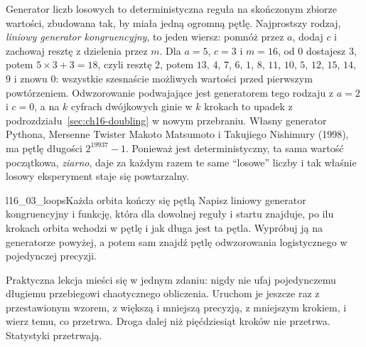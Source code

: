 \noindent
Generator liczb losowych to deterministyczna reguła na skończonym zbiorze
wartości, zbudowana tak, by miała jedną ogromną pętlę. Najprostszy rodzaj,
\emph{liniowy generator kongruencyjny}, to jeden wiersz: pomnóż przez $a$,
dodaj $c$ i zachowaj resztę z dzielenia przez $m$. Dla $a = 5$, $c = 3$ i
$m = 16$, od $0$ dostajesz $3$, potem $5 \times 3 + 3 = 18$, czyli resztę
$2$, potem $13$, $4$, $7$, $6$, $1$, $8$, $11$, $10$, $5$, $12$, $15$, $14$,
$9$ i znowu $0$: wszystkie szesnaście możliwych wartości przed pierwszym
powtórzeniem. Odwzorowanie podwajające jest generatorem tego rodzaju z
$a = 2$ i $c = 0$, a na $k$ cyfrach dwójkowych ginie w $k$ krokach \dash{}
to upadek z podrozdziału~\ref{sec:ch16-doubling} w nowym przebraniu. Własny
generator Pythona, Mersenne Twister Makoto Matsumoto i Takujiego Nishimury
(1998), ma pętlę długości $2^{19937} - 1$. Ponieważ jest deterministyczny,
ta sama wartość początkowa, \emph{ziarno}, daje za każdym razem te same
\enquote{losowe} liczby i tak właśnie losowy eksperyment staje się
powtarzalny.

\begin{lab}{l16_03_loops}{Każda orbita kończy się pętlą}
Napisz liniowy generator kongruencyjny i funkcję, która dla dowolnej reguły
i startu znajduje, po ilu krokach orbita wchodzi w pętlę i jak długa jest ta
pętla. Wypróbuj ją na generatorze powyżej, a potem sam znajdź pętlę
odwzorowania logistycznego w pojedynczej precyzji.
\end{lab}

\noindent
Praktyczna lekcja mieści się w jednym zdaniu: nigdy nie ufaj pojedynczemu
długiemu przebiegowi chaotycznego obliczenia. Uruchom je jeszcze raz z
przestawionym wzorem, z większą i mniejszą precyzją, z mniejszym krokiem, i
wierz temu, co przetrwa. Droga dalej niż pięćdziesiąt kroków nie przetrwa.
Statystyki przetrwają.

